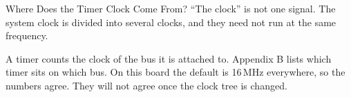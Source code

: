 \documentclass[9pt,aspectratio=169,xcolor=table]{beamer}
\begin{document}
\begin{frame}{Where Does the Timer Clock Come From?}
    \leavevmode
    ``The clock'' is not one signal. The system clock is divided into several clocks, and they need not run at the same frequency.

    \vspace{2mm}
    \begin{center}
    \end{center}

    \vspace{1mm}
    {\small A timer counts the clock of \alert{the bus it is attached to}. Appendix B lists which timer sits on which bus. On this board the default is 16\,MHz everywhere, so the numbers agree. They will not agree once the clock tree is changed.}
\end{frame}
\end{document}
